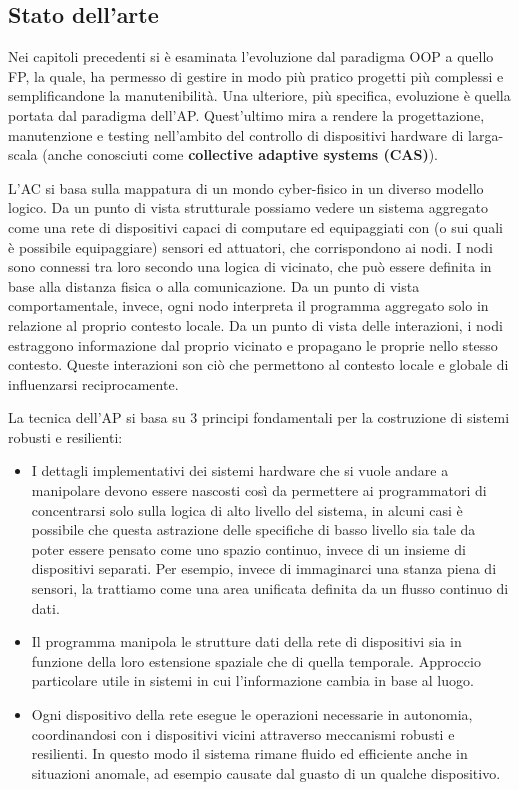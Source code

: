 \documentclass[12pt,a4paper,openright,twoside]{book}
\begin{document}
\subsection{Stato dell'arte}

Nei capitoli precedenti si è esaminata l'evoluzione dal paradigma \ac{OOP} a quello \ac{FP}, la quale, ha permesso di gestire in modo più pratico progetti più complessi e semplificandone la manutenibilità. Una ulteriore, più specifica, evoluzione è quella portata dal paradigma dell'\ac{AP}. Quest'ultimo mira a rendere la progettazione, manutenzione e testing nell'ambito del controllo di dispositivi hardware di larga-scala (anche conosciuti come \textbf{collective adaptive systems (CAS)}).

L'\ac{AC} si basa sulla mappatura di un mondo cyber-fisico in un diverso modello logico. Da un punto di vista strutturale possiamo vedere un sistema aggregato come una rete di dispositivi capaci di computare ed equipaggiati con (o sui quali è possibile equipaggiare) sensori ed attuatori, che corrispondono ai nodi. I nodi sono connessi tra loro secondo una logica di vicinato, che può essere definita in base alla distanza fisica o alla comunicazione. Da un punto di vista comportamentale, invece, ogni nodo interpreta il programma aggregato solo in relazione al proprio contesto locale. Da un punto di vista delle interazioni, i nodi estraggono informazione dal proprio vicinato e propagano le proprie nello stesso contesto. Queste interazioni son ciò che permettono al contesto locale e globale di influenzarsi reciprocamente.

La tecnica dell'\ac{AP} si basa su 3 principi fondamentali per la costruzione di sistemi robusti e resilienti:

\begin{itemize}
    \item I dettagli implementativi dei sistemi hardware che si vuole andare a manipolare devono essere nascosti così da permettere ai programmatori di concentrarsi solo sulla logica di alto livello del sistema, in alcuni casi è possibile che questa astrazione delle specifiche di basso livello sia tale da poter essere pensato come uno spazio continuo, invece di un insieme di dispositivi separati. Per esempio, invece di immaginarci una stanza piena di sensori, la trattiamo come una area unificata definita da un flusso continuo di dati.
    \item Il programma manipola le strutture dati della rete di dispositivi sia in funzione della loro estensione spaziale che di quella temporale. Approccio particolare utile in sistemi in cui l'informazione cambia in base al luogo.
    \item Ogni dispositivo della rete esegue le operazioni necessarie in autonomia, coordinandosi con i dispositivi vicini attraverso meccanismi robusti e resilienti. In questo modo il sistema rimane fluido ed efficiente anche in situazioni anomale, ad esempio causate dal guasto di un qualche dispositivo.
\end{itemize}
\end{document}
